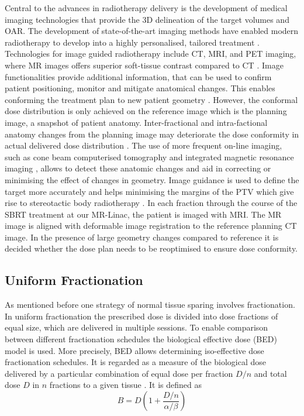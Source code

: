 \documentclass[\relativeRoot/ada.tex]{subfiles}
\begin{document}
Central to the advances in radiotherapy delivery is the development of medical imaging technologies that provide the 3D delineation of the target volumes and OAR. The development of state-­of-­the-­art imaging methods have enabled modern radiotherapy to develop into a highly personalised, tailored treatment \cite{jaffray_imageguided}. Technologies for image guided radiotherapy include CT, MRI, and PET imaging, where MR images offers superior soft-tissue contrast compared to CT \cite{acharya_onlinemrguided}. Image functionalities provide additional information, that can be used to confirm patient positioning, monitor and mitigate anatomical changes. This enables conforming the treatment plan to new patient geometry \cite{jaffray_imageguided}. However, the conformal dose distribution is only achieved on the reference image which is the planning image, a snapshot of patient anatomy. Inter-fractional and intra-factional anatomy changes from the planning image may deteriorate the dose conformity in actual delivered dose distribution \cite{seungjong_deformable}. The use of more frequent on-line imaging, such as cone beam computerised tomography \cite{jaffray_conebeam} and integrated magnetic resonance imaging \cite{lagendijk_integration}, allows to detect these anatomic changes and aid in correcting or minimising the effect of changes in geometry. Image guidance is used to define the target more accurately and helps minimising the margins of the PTV which give rise to stereotactic body radiotherapy \cite{guckenberger_escalate}. In each fraction through the course of the SBRT treatment at our MR-Linac, the patient is imaged with MRI. The MR image is aligned with deformable image registration to the reference planning CT image. In the presence of large geometry changes compared to reference it is decided whether the dose plan needs to be reoptimised to ensure dose conformity.

\subsection{Uniform Fractionation}

As mentioned before one strategy of normal tissue sparing involves fractionation. In uniform fractionation the prescribed dose is divided into dose fractions of equal size, which are delivered in multiple sessions. To enable comparison between different fractionation schedules the biological effective dose (BED) model is used. More precisely, BED allows determining iso-effective dose fractionation schedules. It is regarded as a measure of the biological dose delivered by a particular combination of equal dose per fraction $D/n$ and total dose $D$ in $n$ fractions to a given tissue \cite{jones_bedrole}. It is defined as
\begin{equation*}
	B = D\left(1+\frac{D / n}{\alpha / \beta}\right)
\end{equation*}
\end{document}
